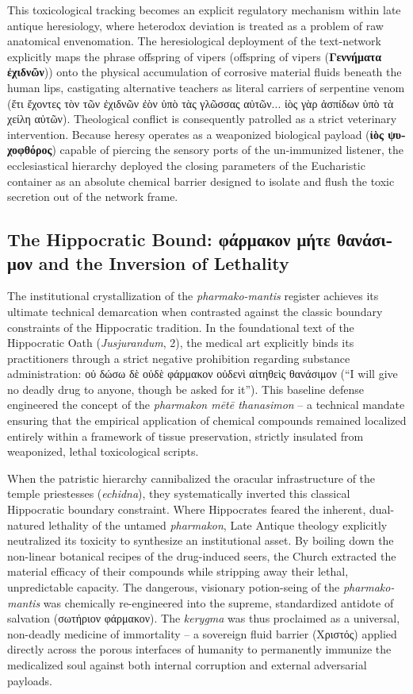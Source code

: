 \documentclass[11pt,twoside,a4paper]{article}
\begin{document}
This toxicological tracking becomes an explicit regulatory mechanism within late antique heresiology, where heterodox deviation is treated as a problem of raw anatomical envenomation. The heresiological deployment of the text-network explicitly maps the phrase offspring of vipers (offspring of vipers (\textgreek{\textbf{Γεννήματα ἐχιδνῶν}})) onto the physical accumulation of corrosive material fluids beneath the human lips, castigating alternative teachers as literal carriers of serpentine venom (\textgreek{ἔτι ἔχοντες τὸν τῶν ἐχιδνῶν ἐὸν ὑπὸ τὰς γλῶσσας αὐτῶν... ἰὸς γὰρ ἀσπίδων ὑπὸ τὰ χείλη αὐτῶν}). Theological conflict is consequently patrolled as a strict veterinary intervention. Because heresy operates as a weaponized biological payload (\textgreek{\textbf{ἰὸς ψυχοφθόρος}}) capable of piercing the sensory ports of the un-immunized listener, the ecclesiastical hierarchy deployed the closing parameters of the Eucharistic container as an absolute chemical barrier designed to isolate and flush the toxic secretion out of the network frame.


\subsection{The Hippocratic Bound: \textgreek{φάρμακον μήτε θανάσιμον} and the Inversion of Lethality}
The institutional crystallization of the \textit{pharmako-mantis} register achieves its ultimate technical demarcation when contrasted against the classic boundary constraints of the Hippocratic tradition. In the foundational text of the Hippocratic Oath (\textit{Jusjurandum}, 2), the medical art explicitly binds its practitioners through a strict negative prohibition regarding substance administration: \textgreek{οὐ δώσω δὲ οὐδὲ φάρμακον οὐδενὶ αἰτηθεὶς θανάσιμον} (``I will give no deadly drug to anyone, though be asked for it''). This baseline defense engineered the concept of the \textit{pharmakon mētē thanasimon} -- a technical mandate ensuring that the empirical application of chemical compounds remained localized entirely within a framework of tissue preservation, strictly insulated from weaponized, lethal toxicological scripts.

When the patristic hierarchy cannibalized the oracular infrastructure of the temple priestesses (\textit{echidna}), they systematically inverted this classical Hippocratic boundary constraint. Where Hippocrates feared the inherent, dual-natured lethality of the untamed \textit{pharmakon}, Late Antique theology explicitly neutralized its toxicity to synthesize an institutional asset. 
By boiling down the non-linear botanical recipes of the drug-induced seers, the Church extracted the material efficacy of their compounds while stripping away their lethal, unpredictable capacity. The dangerous, visionary potion-seing of the \textit{pharmako-mantis} was chemically re-engineered into the supreme, standardized antidote of salvation (\textgreek{σωτήριον φάρμακον}). The \textit{kerygma} was thus proclaimed as a universal, non-deadly medicine of immortality -- a sovereign fluid barrier (\textgreek{Χριστός}) applied directly across the porous interfaces of humanity to permanently immunize the medicalized soul against both internal corruption and external adversarial payloads.
\end{document}

